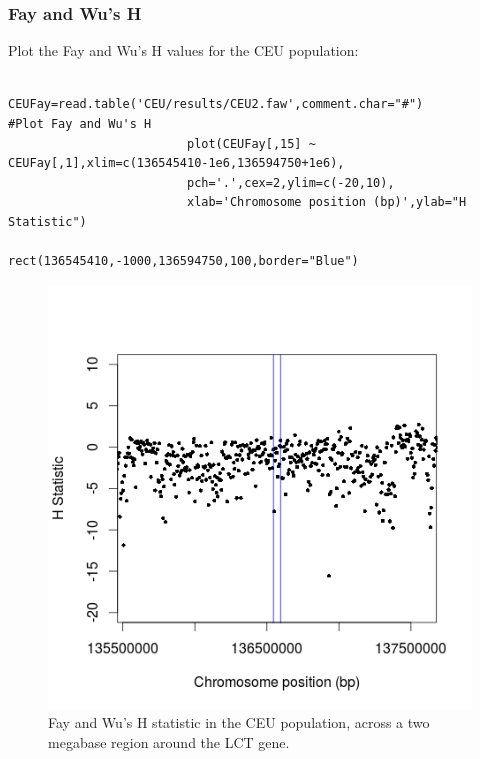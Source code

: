 \documentclass[a4paper,10pt]{article}
\begin{document}
                         \subsubsection{Fay and Wu's H}
                         Plot the Fay and Wu's H values for the CEU population:\\
                         \begin{verbatim}
                         CEUFay=read.table('CEU/results/CEU2.faw',comment.char="#")
#Plot Fay and Wu's H
                         plot(CEUFay[,15] ~ CEUFay[,1],xlim=c(136545410-1e6,136594750+1e6),
                         pch='.',cex=2,ylim=c(-20,10),
                         xlab='Chromosome position (bp)',ylab="H Statistic")
                         rect(136545410,-1000,136594750,100,border="Blue") 
                         \end{verbatim}
                         \begin{figure}
                         \centering
                         \includegraphics{pictures/CEUFay.png}
                         \caption{Fay and Wu's H statistic in the CEU population, across a two
                           megabase region around the LCT gene.}
                           \label{fig:fayceu}
                           \end{figure}
\end{document}
